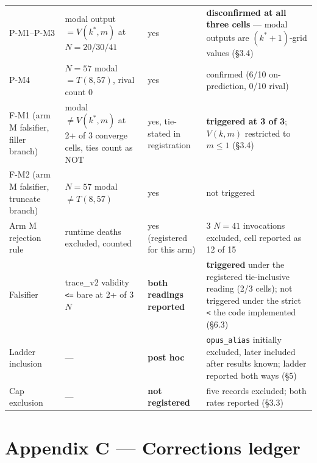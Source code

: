 \documentclass[11pt]{article}
\begin{document}
\begin{longtable}{L{19mm}L{39mm}L{20mm}L{67mm}}
P-M1--P-M3 & modal output $=V(k^{*}, m)$ at $N = 20/30/41$ & yes & \textbf{disconfirmed at all three cells} --- modal outputs are $(k^{*}{+}1)$-grid values (\S3.4) \\
P-M4 & $N = 57$ modal $=T(8,57)$, rival count 0 & yes & confirmed (6/10 on-prediction, 0/10 rival) \\
F-M1 (arm M falsifier, filler branch) & modal $\ne V(k^{*}, m)$ at 2+ of 3 converge cells, ties count as NOT & yes, tie-stated in registration & \textbf{triggered at 3 of 3}; $V(k, m)$ restricted to $m \le 1$ (\S3.4) \\
F-M2 (arm M falsifier, truncate branch) & $N = 57$ modal $\ne T(8,57)$ & yes & not triggered \\
Arm M rejection rule & runtime deaths excluded, counted & yes (registered for this arm) & 3 $N = 41$ invocations excluded, cell reported as 12 of 15 \\
\addlinespace
Falsifier & trace\_v2 validity \texttt{<=} bare at 2+ of 3 $N$ & \textbf{both readings reported} & \textbf{triggered} under the registered tie-inclusive reading (2/3 cells); not triggered under the strict \texttt{<} the code implemented (\S6.3) \\
\addlinespace
Ladder inclusion & --- & \textbf{post hoc} & \texttt{opus\_alias} initially excluded, later included after results known; ladder reported both ways (\S5) \\
\addlinespace
Cap exclusion & --- & \textbf{not registered} & five records excluded; both rates reported (\S3.3) \\
\end{longtable}
\endgroup

\nocite{*}



\section*{Appendix C --- Corrections ledger}
\end{document}
